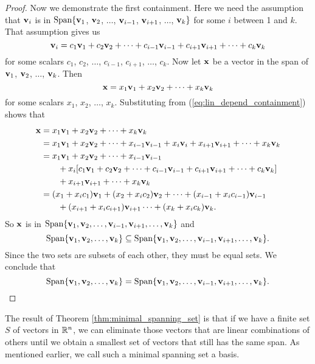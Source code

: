 \begin{proof}
Now we demonstrate the first containment. Here we need the assumption that $\mathbf{v}_i$ is in $\text{Span} \{\mathbf{v}_1$, $\mathbf{v}_2$, $\ldots$, $\mathbf{v}_{i-1}$, $\mathbf{v}_{i+1}$, $\ldots$, $\mathbf{v}_k\}$ for some $i$ between 1 and $k$. That assumption gives us 
\begin{equation} \label{eq:lin_depend_containment}
\mathbf{v}_i = c_1 \mathbf{v}_1 + c_2\mathbf{v}_2 + \cdots + c_{i-1}\mathbf{v}_{i-1} + c_{i+1}\mathbf{v}_{i+1} + \cdots + c_k\mathbf{v}_k
\end{equation}
for some scalars $c_1$, $c_2$, $\ldots$, $c_{i-1}$, $c_{i+1}$, $\ldots$, $c_k$. Now let $\mathbf{x}$ be a vector in the span of $\mathbf{v}_1$, $\mathbf{v}_2$, $\ldots$, $\mathbf{v}_k$. Then
\[\mathbf{x} = x_1\mathbf{v}_1 + x_2\mathbf{v}_2 + \cdots + x_k\mathbf{v}_k\]
for some scalars $x_1$, $x_2$, $\ldots$, $x_k$. Substituting from (\ref{eq:lin_depend_containment}) shows that 
\begin{align*}
\mathbf{x} &= x_1\mathbf{v}_1 + x_2\mathbf{v}_2 + \cdots + x_k\mathbf{v}_k \\
	&= x_1\mathbf{v}_1 + x_2\mathbf{v}_2 + \cdots + x_{i-1} \mathbf{v}_{i-1} + x_i \mathbf{v}_i + x_{i+1}\mathbf{v}_{i+1} + \cdots + x_k\mathbf{v}_k \\
	&= x_1\mathbf{v}_1 + x_2\mathbf{v}_2 + \cdots + x_{i-1} \mathbf{v}_{i-1} \\
	&\qquad + x_i[c_1 \mathbf{v}_1 + c_2\mathbf{v}_2 + \cdots + c_{i-1}\mathbf{v}_{i-1} + c_{i+1}\mathbf{v}_{i+1} + \cdots + c_k\mathbf{v}_k]  \\
	&\qquad + x_{i+1}\mathbf{v}_{i+1} + \cdots + x_k\mathbf{v}_k \\
	&= (x_1+x_ic_1)\mathbf{v}_1 + (x_2+x_ic_2)\mathbf{v}_2 + \cdots + (x_{i-1}+x_ic_{i-1}) \mathbf{v}_{i-1} \\
	&\qquad + (x_{i+1}+x_ic_{i+1}) \mathbf{v}_{i+1} \cdots + (x_k+x_ic_k)\mathbf{v}_k.
\end{align*}
So $\mathbf{x}$ is in $\text{Span} \{\mathbf{v}_1, \mathbf{v}_2, \ldots, \mathbf{v}_{i-1}, \mathbf{v}_{i+1}, \ldots, \mathbf{v}_k\}$ and 
\[\text{Span} \{\mathbf{v}_1, \mathbf{v}_2, \ldots, \mathbf{v}_k\} \subseteq \text{Span} \{\mathbf{v}_1, \mathbf{v}_2, \ldots, \mathbf{v}_{i-1}, \mathbf{v}_{i+1}, \ldots, \mathbf{v}_k\}.\]
 Since the two sets are subsets of each other, they must be equal sets. We conclude that
\[\text{Span} \{\mathbf{v}_1, \mathbf{v}_2, \ldots, \mathbf{v}_k\} = \text{Span} \{\mathbf{v}_1, \mathbf{v}_2, \ldots, \mathbf{v}_{i-1}, \mathbf{v}_{i+1}, \ldots, \mathbf{v}_k\}.\]
\end{proof}



The result of Theorem \ref{thm:minimal_spanning_set} is that if we have a finite set $S$ of vectors in $\mathbb{R}^n$, we can eliminate those vectors that are linear combinations of others until we obtain a smallest set of vectors that still has the same span. As mentioned earlier, we call such a minimal spanning set a basis.



